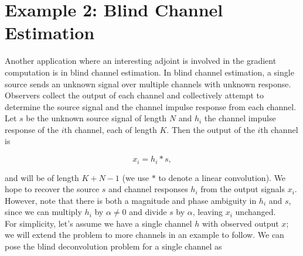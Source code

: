 \documentclass[journal]{IEEEtran}
\begin{document}
%
%

\section{Example 2: Blind Channel Estimation}

Another application where an interesting adjoint is involved in the gradient computation is in blind channel estimation.  In blind channel estimation, a single source sends an unknown signal over multiple channels with unknown response.  Observers collect the output of each channel and collectively attempt to determine the source signal and the channel impulse response from each channel.  Let $s$ be the unknown source signal of length $N$ and $h_i$ the channel impulse response of the $i$th channel, each of length $K$.  Then the output of the $i$th channel is

\[ x_i = h_i\ast s, \] 

\noindent and will be of length $K+N-1$ (we use $\ast$ to denote a linear convolution).  We hope to recover the source $s$ and channel responses $h_i$ from the output signals $x_i$.   However, note that there is both a magnitude and phase ambiguity in $h_i$ and $s$, since we can multiply $h_i$ by $\alpha\neq 0$ and divide $s$ by $\alpha$, leaving $x_i$ unchanged.\\

For simplicity, let's assume we have a single channel $h$ with observed output $x$; we will extend the problem to more channels in an example to follow.  We can pose the blind deconvolution problem for a single channel as
\end{document}
